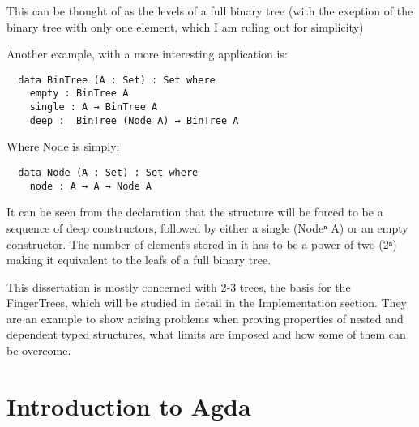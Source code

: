 \documentclass[12pt,twoside,notitlepage]{report}
\newcommand{\Conid}[1]{\mathit{#1}}
\newcommand{\Varid}[1]{\mathit{#1}}
\def\resethooks{%
  \global\let\SaveRestoreHook\empty
  \global\let\ColumnHook\empty}
\newcommand{\hsindent}[1]{\quad}%
\let\hspre\empty
\let\hspost\empty
\begin{document}
\resethooks

This can be thought of as the levels of a full binary tree (with the exeption of the binary tree with only
one element, which I am ruling out for simplicity)


Another example, with a more interesting application is:

\begin{verbatim}
  data BinTree (A : Set) : Set where
    empty : BinTree A
    single : A → BinTree A
    deep :  BinTree (Node A) → BinTree A
\end{verbatim}
Where Node is simply:
\begin{verbatim}
  data Node (A : Set) : Set where
    node : A → A → Node A
\end{verbatim}

It can be seen from the declaration that the structure will be forced to be a sequence of deep
constructors, followed by either a single (Nodeⁿ A) or an empty constructor. The number
of elements stored in it has to be a power of two (2ⁿ) making it equivalent to the leafs of a full
binary tree.

This dissertation is mostly concerned with 2-3 trees, the basis for the FingerTrees, which
will be studied in detail in the Implementation section. They are an example to show arising problems
when proving properties of nested and dependent typed structures, what limits are imposed and how
some of them can be overcome.

\section{Introduction to Agda}
\end{document}
